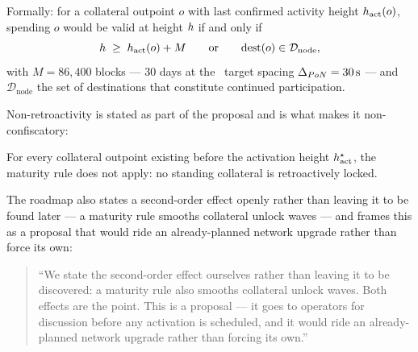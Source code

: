 Formally: for a collateral outpoint $o$ with last confirmed activity height $h_{\mathrm{act}}(o)$,
spending $o$ would be valid at height $h$ if and only if
\[
h \;\ge\; h_{\mathrm{act}}(o) + M
\qquad\text{or}\qquad
\mathrm{dest}(o) \in \mathcal{D}_{\text{node}},
\]
with $M = 86{,}400$ blocks — 30 days at the \PoN\ target spacing $\Delta_{PoN} = 30\,\mathrm{s}$ — and
$\mathcal{D}_{\text{node}}$ the set of destinations that constitute continued participation.



Non-retroactivity is stated as part of the proposal and is what makes it non-confiscatory:

\begin{property}
For every collateral outpoint existing before the activation height $h_{\mathrm{act}}^{\star}$, the
maturity rule does not apply: no standing collateral is retroactively locked.
\end{property}

The roadmap also states a second-order effect openly rather than leaving it to be found later — a
maturity rule smooths collateral unlock waves — and frames this as a proposal that would ride an
already-planned network upgrade rather than force its own:

\begin{quote}
``We state the second-order effect ourselves rather than leaving it to be discovered: a maturity rule
also smooths collateral unlock waves. Both effects are the point. This is a proposal — it goes to
operators for discussion before any activation is scheduled, and it would ride an already-planned
network upgrade rather than forcing its own.'' 
\end{quote}

